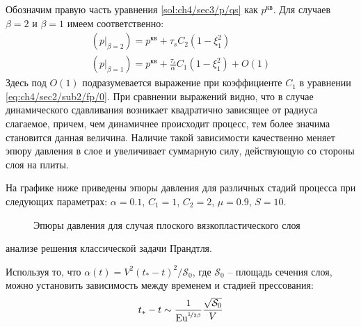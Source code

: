 Обозначим правую часть уравнения \cref{sol:ch4/sec3/p/qs} как $p^\text{кв}$. Для случаев $\beta=2$ и $\beta=1$ имеем соответственно:
\begin{gather}
  \left(p\lvert_{\beta=2}\right) = p^\text{кв} + \tau_{s} C_2 \left(1-\xi_1^2\right)
  \\
  \left(p\lvert_{\beta=1}\right) = p^\text{кв} + \frac{\tau_{s}}{\alpha} C_1 \left(1-\xi_1^2\right) + O(1)
\end{gather}
Здесь под $O(1)$ подразумевается выражение при коэффициенте $C_1$ в уравнении \cref{eq:ch4/sec2/sub2/fp/0}.
При сравнении выражений видно, что в случае динамического сдавливания возникает квадратично зависящее от радиуса слагаемое, причем, чем динамичнее происходит процесс, тем более значима становится данная величина. Наличие такой зависимости качественно меняет эпюру давления в слое и увеличивает суммарную силу, действующую со стороны слоя на плиты.

На графике ниже приведены эпюры давления для различных стадий процесса при следующих параметрах: $\alpha=0.1$, $C_1=1$, $C_2=2$, $\mu=0.9$, $S=10$.
\begin{figure}[ht]
    \caption{Эпюры давления для случая плоского вязкопластического слоя}
    \label{fig:ch4/pressure}
\end{figure}анализе решения классической задачи Прандтля.

Используя то, что $\alpha(t) = V^2\left(t_*-t\right)^2 / \mathcal{S}_0$, где $\mathcal{S}_0$ -- площадь сечения слоя, можно установить зависимость между временем и стадией прессования:
\begin{equation}
  t_* - t \sim \frac{1}{\text{Eu}^{\nicefrac{1}{2\beta}}}\frac{\sqrt{\mathcal{S}_0}}{V}
\end{equation}
